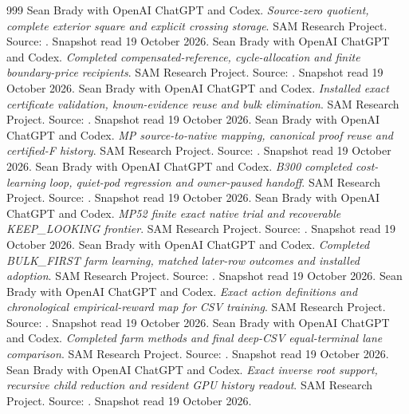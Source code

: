 \begin{thebibliography}{999}
 Sean Brady with OpenAI ChatGPT and Codex. \emph{Source-zero quotient, complete exterior square and explicit crossing storage}. SAM Research Project. Source: . Snapshot read 19 October 2026.
 Sean Brady with OpenAI ChatGPT and Codex. \emph{Completed compensated-reference, cycle-allocation and finite boundary-price recipients}. SAM Research Project. Source: . Snapshot read 19 October 2026.
 Sean Brady with OpenAI ChatGPT and Codex. \emph{Installed exact certificate validation, known-evidence reuse and bulk elimination}. SAM Research Project. Source: . Snapshot read 19 October 2026.
 Sean Brady with OpenAI ChatGPT and Codex. \emph{MP source-to-native mapping, canonical proof reuse and certified-F history}. SAM Research Project. Source: . Snapshot read 19 October 2026.
 Sean Brady with OpenAI ChatGPT and Codex. \emph{B300 completed cost-learning loop, quiet-pod regression and owner-paused handoff}. SAM Research Project. Source: . Snapshot read 19 October 2026.
 Sean Brady with OpenAI ChatGPT and Codex. \emph{MP52 finite exact native trial and recoverable KEEP\_LOOKING frontier}. SAM Research Project. Source: . Snapshot read 19 October 2026.
 Sean Brady with OpenAI ChatGPT and Codex. \emph{Completed BULK\_FIRST farm learning, matched later-row outcomes and installed adoption}. SAM Research Project. Source: . Snapshot read 19 October 2026.
 Sean Brady with OpenAI ChatGPT and Codex. \emph{Exact action definitions and chronological empirical-reward map for CSV training}. SAM Research Project. Source: . Snapshot read 19 October 2026.
 Sean Brady with OpenAI ChatGPT and Codex. \emph{Completed farm methods and final deep-CSV equal-terminal lane comparison}. SAM Research Project. Source: . Snapshot read 19 October 2026.
 Sean Brady with OpenAI ChatGPT and Codex. \emph{Exact inverse root support, recursive child reduction and resident GPU history readout}. SAM Research Project. Source: . Snapshot read 19 October 2026.

\end{thebibliography}
